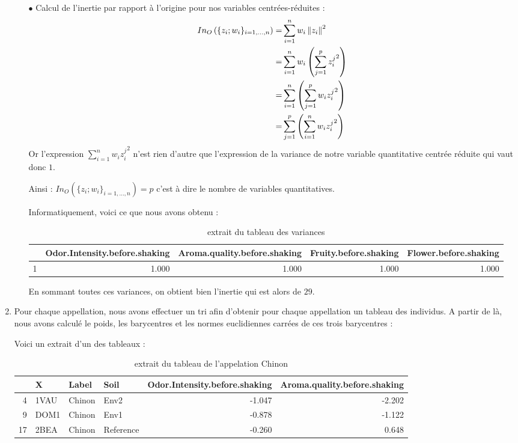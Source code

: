 \documentclass{article}
\begin{document}
\begin{enumerate}
\begin{itemize}
    \item[$\bullet$] Calcul de l'inertie  par rapport à l'origine pour nos variables centrées-réduites : 
    \begin{align*}
       In_{O}\left(\{z_i;w_i\}_{i=1,...,n}\right) = & \sum_{i=1}^{n} w_i \left\| z_{i}\right\|^2 \\
       = & \sum_{i=1}^{n} w_i \left(\sum_{j=1}^p {z_i^j}^2\right)\\
       =& \sum_{i=1}^{n} \left(\sum_{j=1}^p w_i {z_i^j}^2\right) \\
       =& \sum_{j=1}^p \left( \sum_{i=1}^{n}w_i {z_i^j}^2\right)
    \end{align*}
    Or l'expression $\displaystyle \sum_{i=1}^{n}w_i {z_i^j}^2$ n'est rien d'autre que l'expression de la variance de notre variable quantitative centrée réduite qui vaut donc $1$. 

    Ainsi : $In_{O}\left(\{z_i;w_i\}_{i=1,...,n}\right) = p$ c'est à dire le nombre de variables quantitatives.
    
    Informatiquement, voici ce que nous avons obtenu : 

\begin{table}[ht]
\centering
\begin{tabular}{rrrrr}
  \hline
 & Odor.Intensity.before.shaking & Aroma.quality.before.shaking & Fruity.before.shaking & Flower.before.shaking \\ 
  \hline
1 & 1.000 & 1.000 & 1.000 & 1.000 \\ 
   \hline
\end{tabular}
\caption{extrait du tableau des variances} 
\end{table}  

En sommant toutes ces variances, on obtient bien l'inertie qui est alors de $29$.  
    \end{itemize}

\item Pour chaque appellation, nous avons effectuer un tri afin d'obtenir pour chaque appellation un tableau des individus. A partir de là, nous avons calculé le poids, les barycentres et les normes euclidiennes carrées de ces trois barycentres : 

Voici un extrait d'un des tableaux : 

\begin{table}[ht]
\centering
\begin{tabular}{rlllrr}
  \hline
 & X & Label & Soil & Odor.Intensity.before.shaking & Aroma.quality.before.shaking \\ 
  \hline
4 & 1VAU & Chinon & Env2 & -1.047 & -2.202 \\ 
  9 & DOM1 & Chinon & Env1 & -0.878 & -1.122 \\ 
  17 & 2BEA & Chinon & Reference & -0.260 & 0.648 \\ 
   \hline
\end{tabular}
\caption{extrait du tableau de l'appelation Chinon} 
\end{table}


\end{enumerate}
\end{document}
